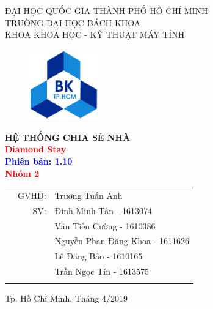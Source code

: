 \documentclass[a4paper]{article}
\begin{document}
\begin{titlepage}
\begin{center}
ĐẠI HỌC QUỐC GIA THÀNH PHỐ HỒ CHÍ MINH \\
TRƯỜNG ĐẠI HỌC BÁCH KHOA \\
KHOA KHOA HỌC - KỸ THUẬT MÁY TÍNH 
\end{center}

\vspace{1cm}

\begin{figure}[h!]
\begin{center}
\includegraphics[width=3cm]{Image/hcmut.png}
\end{center}
\end{figure}

\vspace{0.5cm}

\begin{center}
\textbf{\huge HỆ THỐNG CHIA SẺ NHÀ}\\
\vspace{0.25cm}
\textbf{\Huge \textcolor{red}{Diamond Stay}}\\
\textbf{\huge \textcolor{blue}{Phiên bản: 1.10}}\\
\vspace{1.5cm}
\textcolor{red}{\textbf{\huge  Nhóm 2}}

\end{center}

\vspace{0.7cm}


\begin{table}[h]
\begin{tabular}{rrl}
\hspace{5 cm} & GVHD: & Trương Tuấn Anh\\
& SV: & Đinh Minh Tân - 1613074 \\
& & Văn Tiến Cường - 1610386\\
& & Nguyễn Phan Đăng Khoa - 1611626\\
& & Lê Đăng Bảo - 1610165\\
& & Trần Ngọc Tín - 1613575\\
\vspace{2.3cm}

\end{tabular}
\end{table}

\begin{center}
{\footnotesize Tp. Hồ Chí Minh, Tháng 4/2019}
\end{center}
\end{titlepage}
\end{document}
